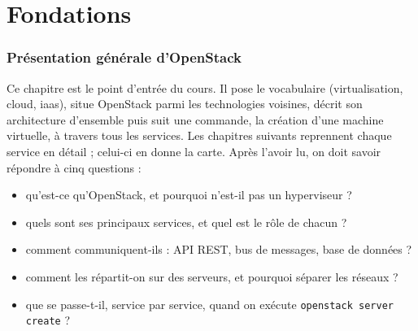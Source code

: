 
\part{Fondations}\label{part:fondations}

\section{Présentation générale d'OpenStack}\label{chap:presentation}

Ce chapitre est le point d'entrée du cours. Il pose le vocabulaire (virtualisation, cloud, \gls{iaas}), situe OpenStack parmi les
technologies voisines, décrit son architecture d'ensemble puis suit une commande, la création d'une machine virtuelle, à travers
tous les services. Les chapitres suivants reprennent chaque service en détail ; celui-ci en donne la carte. Après l'avoir lu, on
doit savoir répondre à cinq questions :

\begin{itemize}
  \item qu'est-ce qu'OpenStack, et pourquoi n'est-il pas un hyperviseur ?
  \item quels sont ses principaux services, et quel est le rôle de chacun ?
  \item comment communiquent-ils : API REST, bus de messages, base de données ?
  \item comment les répartit-on sur des serveurs, et pourquoi séparer les réseaux ?
  \item que se passe-t-il, service par service, quand on exécute \texttt{openstack server create} ?
\end{itemize}

